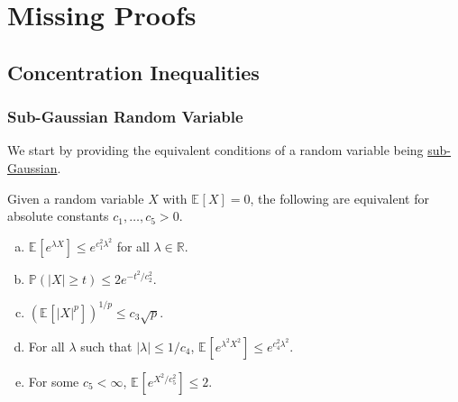 \chapter{Missing Proofs}
\section{Concentration Inequalities}
\subsection{Sub-Gaussian Random Variable}
We start by providing the equivalent conditions of a random variable being \hyperref[def:sub-Gaussian]{sub-Gaussian}.

\begin{lemma}\label{pf-lma:sub-Gaussian}
	Given a random variable \(X\) with \(\mathbb{E}_{}\left[X \right] =0\), the following are equivalent for absolute constants \(c_1, \dots , c_5 > 0\).
	\begin{enumerate}[(a)]
		\item\label{pf-lma:sub-Gaussian-a} \(\mathbb{E}_{}\left[e^{\lambda X} \right] \leq e^{c_1^2 \lambda ^2}\) for all \(\lambda \in \mathbb{R} \).
		\item\label{pf-lma:sub-Gaussian-b} \(\mathbb{P} (\vert X \vert \geq t) \leq 2 e^{- t^2 / c_2^2}\).
		\item\label{pf-lma:sub-Gaussian-c} \(\left( \mathbb{E}_{}\left[\vert X \vert ^p \right]  \right)^{1 / p} \leq c_3 \sqrt{p}  \).
		\item\label{pf-lma:sub-Gaussian-d} For all \(\lambda \) such that \(\vert \lambda  \vert \leq 1 / c_4 \), \(\mathbb{E}_{}\left[e^{\lambda ^2 X^2} \right] \leq e^{c_4^2 \lambda ^2} \).
		\item\label{pf-lma:sub-Gaussian-e} For some \(c_5 < \infty \), \(\mathbb{E}_{}\left[e^{X^2 / c_5^2}  \right] \leq 2\).
	\end{enumerate}
\end{lemma}
